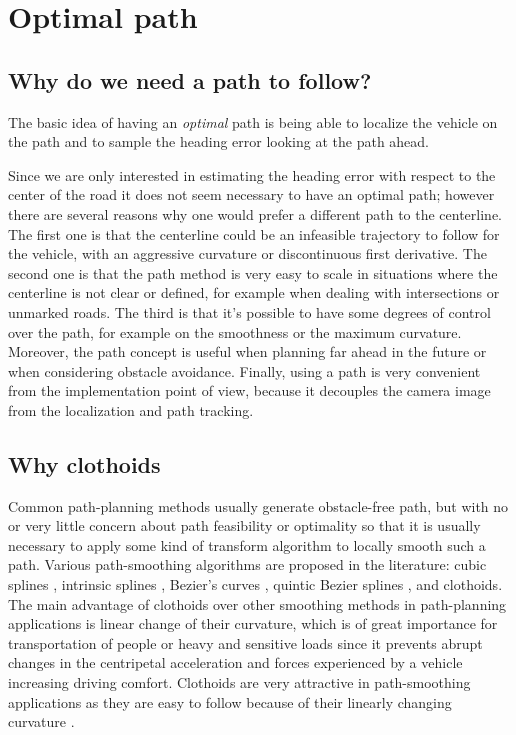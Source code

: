 \documentclass[a4paper,12pt,sort&compress]{article}
\begin{document}
\clearpage

\section{Optimal path}

    \subsection{Why do we need a path to follow?}
    The basic idea of having an \textit{optimal} path is being able to localize the vehicle on the
    path and to sample the heading error looking at the path ahead. 

    Since we are only interested in estimating the heading error with respect to the center of the
    road it does not seem necessary to have an optimal path; however there are several reasons
    why one would prefer a different path to the centerline. The first one is that the centerline
    could be an infeasible trajectory to follow for the vehicle, with an aggressive curvature or
    discontinuous first derivative. The second one is that the path
    method is very easy to scale in situations where the centerline is not clear or defined, for
    example when dealing with intersections or unmarked roads. The third is that it's possible to
    have some degrees of control over the path, for example on the smoothness or the maximum
    curvature. Moreover, the path concept is useful when planning far ahead in the future or when
    considering obstacle avoidance. Finally, using a path is very convenient from the implementation point of
    view, because it decouples the camera image from the localization and path tracking.

    \subsection{Why clothoids}
    Common path-planning methods usually generate obstacle-free path, but with no or very little concern
    about path feasibility or optimality so that it is usually necessary to apply some kind of transform
    algorithm to locally smooth such a path. Various path-smoothing algorithms are proposed in the
    literature: cubic splines \citep*{kanayama1988smooth}, intrinsic splines
    \citep*{delingette1991trajectory}, Bezier's curves \citep*{segovia1991comparative}, quintic
    Bezier splines \citep*{lau2009kinodynamic}, and clothoids. The main advantage of clothoids over
    other smoothing methods in path-planning
    applications is linear change of their curvature, which is of great importance for transportation of
    people or heavy and sensitive loads since it prevents abrupt changes in the centripetal acceleration
    and forces experienced by a vehicle increasing driving comfort. Clothoids are very attractive in
    path-smoothing applications as they are easy to follow because of their linearly changing
    curvature \citep*{shanmugavel2010co}. 
\end{document}
